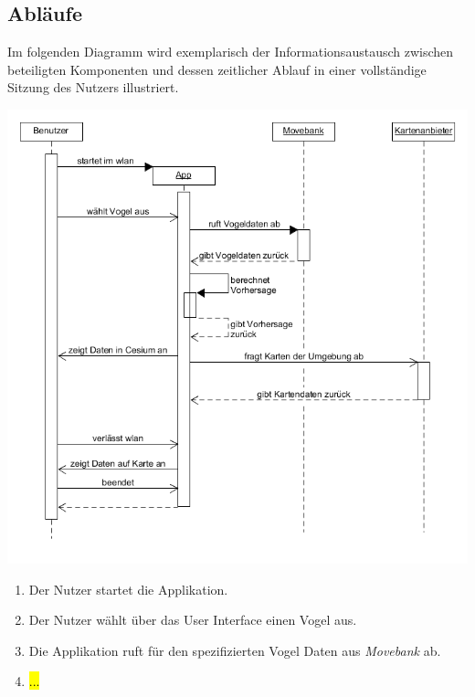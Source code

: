 \documentclass[12pt]{article} %
\newenvironment{cptenumerate}[1][label=\arabic*.]{\begin{enumerate}[#1] \setlength\itemsep{0em}}{\end{enumerate}}
\begin{document}
\subsection{Abläufe}

Im folgenden Diagramm wird exemplarisch der Informationsaustausch zwischen beteiligten Komponenten und dessen zeitlicher Ablauf in einer vollständige Sitzung des Nutzers illustriert. 

\includegraphics[width = 1\linewidth]{Sequenzdiagramm.png}

\begin{cptenumerate} 
 	 \item Der Nutzer startet die Applikation.
 	 \item Der Nutzer wählt über das User Interface einen Vogel aus.
 	 \item Die Applikation ruft für den spezifizierten Vogel Daten aus \textit{Movebank} ab.
 	 \item \hl{...}
\end{cptenumerate} 
\end{document}
